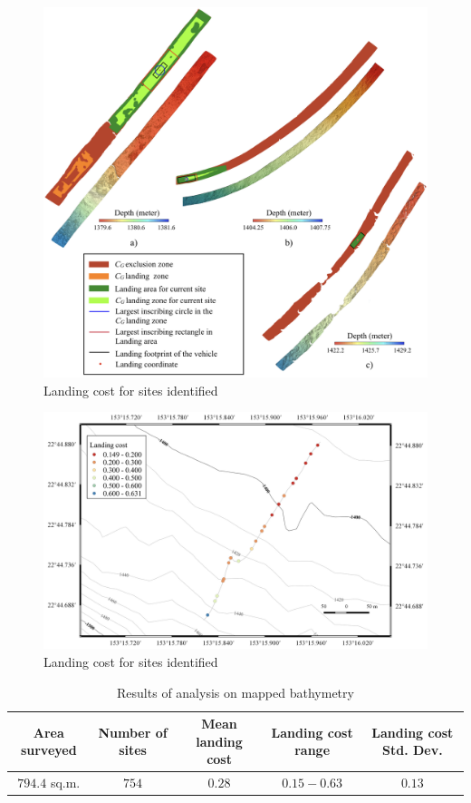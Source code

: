 \begin{figure}[!ht]
\centering
\includegraphics[width=\textwidth]{./images/mehul28.png}
\caption{Landing cost for sites identified}
\label{f:mehul27}
\end{figure}

\begin{figure}[!ht]
\centering
\includegraphics[width=6in]{./images/mehul27.png}
\caption{Landing cost for sites identified}
\label{f:mehul28}
\end{figure}

\begin{table}[!ht]
\centering
\caption{Results of analysis on mapped bathymetry}
\begin{tabular}{  |c c c c c|}
\hline
\textbf{Area surveyed} & \textbf{Number of sites} & \textbf{Mean landing cost} & \textbf{Landing cost range} & \textbf{Landing cost Std. Dev.}\\ \hline 
$794.4$ sq.m. & $754$ & $0.28$ & $0.15 - 0.63$ & $0.13$ \\
\hline
\end{tabular}
\label{t:table6}
\end{table}